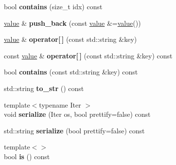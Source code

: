 \begin{DoxyCompactItemize}
\item 
bool {\bfseries contains} (size\+\_\+t idx) const \hypertarget{classpangolin_1_1json_1_1value_a5e5ae3536574540261765ec421f11370}{}\label{classpangolin_1_1json_1_1value_a5e5ae3536574540261765ec421f11370}

\item 
\hyperlink{classpangolin_1_1json_1_1value}{value} \& {\bfseries push\+\_\+back} (const \hyperlink{classpangolin_1_1json_1_1value}{value} \&=\hyperlink{classpangolin_1_1json_1_1value}{value}())\hypertarget{classpangolin_1_1json_1_1value_a2640589bacc1f4d2d840e8e869d9938b}{}\label{classpangolin_1_1json_1_1value_a2640589bacc1f4d2d840e8e869d9938b}

\item 
\hyperlink{classpangolin_1_1json_1_1value}{value} \& {\bfseries operator\mbox{[}$\,$\mbox{]}} (const std\+::string \&key)\hypertarget{classpangolin_1_1json_1_1value_ad6b5b6871a43ca2f3c17e33886a528e2}{}\label{classpangolin_1_1json_1_1value_ad6b5b6871a43ca2f3c17e33886a528e2}

\item 
const \hyperlink{classpangolin_1_1json_1_1value}{value} \& {\bfseries operator\mbox{[}$\,$\mbox{]}} (const std\+::string \&key) const \hypertarget{classpangolin_1_1json_1_1value_a9ab171bf0f42ec8b1330f987acfe52de}{}\label{classpangolin_1_1json_1_1value_a9ab171bf0f42ec8b1330f987acfe52de}

\item 
bool {\bfseries contains} (const std\+::string \&key) const \hypertarget{classpangolin_1_1json_1_1value_a1a1865bacd4995520faf4f990ce11c37}{}\label{classpangolin_1_1json_1_1value_a1a1865bacd4995520faf4f990ce11c37}

\item 
std\+::string {\bfseries to\+\_\+str} () const \hypertarget{classpangolin_1_1json_1_1value_aed94ac9f62ad997a5cb6e391bceda4c8}{}\label{classpangolin_1_1json_1_1value_aed94ac9f62ad997a5cb6e391bceda4c8}

\item 
{\footnotesize template$<$typename Iter $>$ }\\void {\bfseries serialize} (Iter os, bool prettify=false) const \hypertarget{classpangolin_1_1json_1_1value_ac409f37643ce8870949a16340e37a31c}{}\label{classpangolin_1_1json_1_1value_ac409f37643ce8870949a16340e37a31c}

\item 
std\+::string {\bfseries serialize} (bool prettify=false) const \hypertarget{classpangolin_1_1json_1_1value_a94df9fd155f49827a1f68d2aea6f16e8}{}\label{classpangolin_1_1json_1_1value_a94df9fd155f49827a1f68d2aea6f16e8}

\item 
{\footnotesize template$<$$>$ }\\bool {\bfseries is} () const \hypertarget{classpangolin_1_1json_1_1value_a651152b67ff55a21e399655d8c52c105}{}\label{classpangolin_1_1json_1_1value_a651152b67ff55a21e399655d8c52c105}

\end{DoxyCompactItemize}
